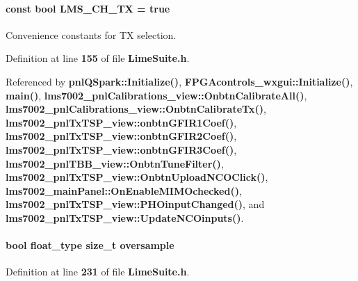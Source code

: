 \paragraph[{L\+M\+S\+\_\+\+C\+H\+\_\+\+TX}]{\setlength{\rightskip}{0pt plus 5cm}const bool L\+M\+S\+\_\+\+C\+H\+\_\+\+TX = true\hspace{0.3cm}{\ttfamily [static]}}\label{group__FN__HIGH__LVL_ga8b66470dd0604888079174a9f9a96daa}


Convenience constants for TX selection. 



Definition at line {\bf 155} of file {\bf Lime\+Suite.\+h}.



Referenced by {\bf pnl\+Q\+Spark\+::\+Initialize()}, {\bf F\+P\+G\+Acontrols\+\_\+wxgui\+::\+Initialize()}, {\bf main()}, {\bf lms7002\+\_\+pnl\+Calibrations\+\_\+view\+::\+Onbtn\+Calibrate\+All()}, {\bf lms7002\+\_\+pnl\+Calibrations\+\_\+view\+::\+Onbtn\+Calibrate\+Tx()}, {\bf lms7002\+\_\+pnl\+Tx\+T\+S\+P\+\_\+view\+::onbtn\+G\+F\+I\+R1\+Coef()}, {\bf lms7002\+\_\+pnl\+Tx\+T\+S\+P\+\_\+view\+::onbtn\+G\+F\+I\+R2\+Coef()}, {\bf lms7002\+\_\+pnl\+Tx\+T\+S\+P\+\_\+view\+::onbtn\+G\+F\+I\+R3\+Coef()}, {\bf lms7002\+\_\+pnl\+T\+B\+B\+\_\+view\+::\+Onbtn\+Tune\+Filter()}, {\bf lms7002\+\_\+pnl\+Tx\+T\+S\+P\+\_\+view\+::\+Onbtn\+Upload\+N\+C\+O\+Click()}, {\bf lms7002\+\_\+main\+Panel\+::\+On\+Enable\+M\+I\+M\+Ochecked()}, {\bf lms7002\+\_\+pnl\+Tx\+T\+S\+P\+\_\+view\+::\+P\+H\+Oinput\+Changed()}, and {\bf lms7002\+\_\+pnl\+Tx\+T\+S\+P\+\_\+view\+::\+Update\+N\+C\+Oinputs()}.

\paragraph[{oversample}]{\setlength{\rightskip}{0pt plus 5cm}bool {\bf float\+\_\+type} size\+\_\+t oversample}\label{group__FN__HIGH__LVL_ga374b0fae227f9f4e513a37dc8131c37c}


Definition at line {\bf 231} of file {\bf Lime\+Suite.\+h}.




